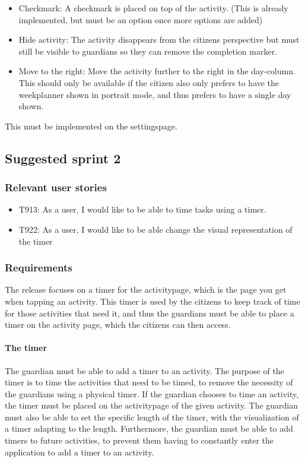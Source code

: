 \begin{itemize}
    \item Checkmark: A checkmark is placed on top of the activity. (This is already implemented, but must be an option once more options are added)
    \item Hide activity: The activity disappears from the citizens perspective but must still be visible to guardians so they can remove the completion marker.
    \item  Move to the right: Move the activity further to the right in the day-column. This should only be available if the citizen also only prefers to have the weekplanner shown in portrait mode, and thus prefers to have a single day shown.
\end{itemize}
This must be implemented on the settingspage.

\subsection*{Suggested sprint 2}
\subsubsection*{Relevant user stories}

\begin{itemize}
    \item T913: As a user, I would like to be able to time tasks using a timer.
    \item T922: As a user, I would like to be able change the visual representation of the timer
\end{itemize}

\subsubsection*{Requirements}
The release focuses on a timer for the activitypage, which is the page you get when tapping an activity. This timer is used by the citizens to keep track of time for those activities that need it, and thus the guardians must be able to place a timer on the activity page, which the citizens can then access.

\paragraph{The timer}
The guardian must be able to add a timer to an activity. The purpose of the timer is to time the activities that need to be timed, to remove the necessity of the guardians using a physical timer. If the guardian chooses to time an activity, the timer must be placed on the activitypage of the given activity. The guardian must also be able to set the specific length of the timer, with the visualization of a timer adapting to the length. Furthermore, the guardian must be able to add timers to future activities, to prevent them having to constantly enter the application to add a timer to an activity.

